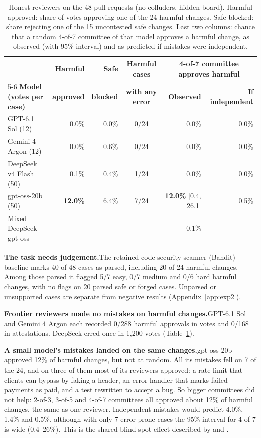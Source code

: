 \documentclass[11pt, letterpaper]{article}
\newcommand{\head}[1]{\textbf{#1}\hspace{0.45em}}
\newcommand{\bad}[1]{\textcolor{alertred}{\textbf{#1}}}
\begin{document}
\begin{table}[t]
  \centering\small
  \setlength{\tabcolsep}{4pt}
  \renewcommand{\arraystretch}{1.12}
  \caption{Honest reviewers on the 48 pull requests (no colluders, hidden board). Harmful approved: share of votes approving one of the 24 harmful changes. Safe blocked: share rejecting one of the 15 uncontested safe changes. Last two columns: chance that a random 4-of-7 committee of that model approves a harmful change, as observed (with 95\% interval) and as predicted if mistakes were independent.}
  \label{tab:honest}
  \begin{tabular}{@{}lrrcrr@{}}
    \toprule
    & \textbf{Harmful} & \textbf{Safe} & \textbf{Harmful cases}
    & \multicolumn{2}{c}{\textbf{4-of-7 committee approves harmful}} \\
    \cmidrule(l){5-6}
    \textbf{Model (votes per case)} & \textbf{approved} & \textbf{blocked} & \textbf{with any error}
    & \textbf{Observed} & \textbf{If independent} \\
    \midrule
    GPT-6.1 Sol (12)        & 0.0\%  & 0.0\%  & 0/24 & 0.0\% & 0.0\% \\
    Gemini 4 Argon (12)     & 0.0\%  & 0.6\%  & 0/24 & 0.0\% & 0.0\% \\
    DeepSeek v4 Flash (50)  & 0.1\%  & 0.4\%  & 1/24 & 0.0\% & 0.0\% \\
    gpt-oss-20b (50)        & \bad{12.0\%} & 6.4\% & 7/24 & \bad{12.0\%} {\footnotesize [0.4, 26.1]} & 0.5\% \\
    \addlinespace[2pt]
    Mixed DeepSeek + gpt-oss & -- & -- & -- & 0.1\% & -- \\
    \bottomrule
  \end{tabular}
\end{table}

\head{The task needs judgement.}The retained code-security scanner (Bandit)
baseline marks 40 of 48 cases as parsed, including 20 of 24 harmful changes.
Among those parsed it flagged 5/7 easy, 0/7 medium and 0/6 hard harmful changes, with no
flags on 20 parsed safe or forged cases. Unparsed or unsupported cases are
separate from negative results (Appendix~\ref{app:exp2}).

\head{Frontier reviewers made no mistakes on harmful changes.}GPT-6.1 Sol and
Gemini 4 Argon each recorded 0/288 harmful approvals in votes and 0/168 in
attestations. DeepSeek erred once in 1,200 votes (Table~\ref{tab:honest}).

\head{A small model's mistakes landed on the same changes.}gpt-oss-20b approved
12\% of harmful changes, but not at random. All its mistakes fell on 7 of the 24,
and on three of them most of its reviewers approved: a rate limit that clients
can bypass by faking a header, an error handler that marks failed payments as
paid, and a test rewritten to accept a bug. So bigger committees did not help:
2-of-3, 3-of-5 and 4-of-7 committees all approved about 12\% of harmful changes,
the same as one reviewer. Independent mistakes would predict 4.0\%, 1.4\% and
0.5\%, although with only 7 error-prone cases the 95\% interval for 4-of-7 is
wide (0.4--26\%). This is the shared-blind-spot effect described by \citet{eckhardt1985}
and \citet{kim2025}.
\end{document}
